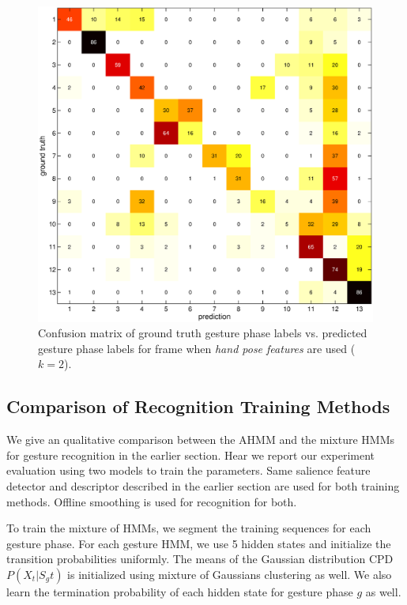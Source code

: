 \documentclass{sigchi}
\begin{document}
\begin{figure}
\centering
\includegraphics[width=1\columnwidth]{figure/cm11.eps}
\caption{Confusion matrix of ground truth gesture phase labels vs. predicted
gesture phase labels for frame when \textit{hand pose features} are used
($k=2$).}
\label{fig:cm11}
\end{figure}

\subsection{Comparison of Recognition Training Methods}
We give an qualitative comparison between the AHMM and the mixture HMMs for
gesture recognition in the earlier section. Hear we report our experiment
evaluation using two models to train the parameters. Same salience feature detector and descriptor
described in the earlier section are used for both training methods. Offline
smoothing is used for recognition for both. 

To train the mixture of HMMs, we segment the training sequences for each gesture
phase. For each gesture HMM, we use 5 hidden states and initialize the
transition probabilities uniformly. The means of the Gaussian distribution CPD
$P(X_t|S_gt)$ is initialized using mixture of Gaussians clustering as well. We
also learn the termination probability of each hidden state for gesture phase
$g$ as well.
\end{document}
